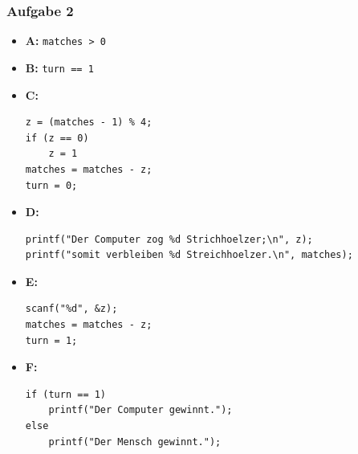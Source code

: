 \documentclass{beamer}
\newcommand*{\ttfamilywithbold}{\fontfamily{lmtt}\selectfont}
\begin{document}
\begin{frame}[fragile] \frametitle{Aufgabe 2}
	\footnotesize
	\begin{itemize}
		\item \textbf{A:} \lstinline|matches > 0|
		\item \textbf{B:} \lstinline|turn == 1|
		\item \textbf{C:} 
		\begin{lstlisting}[basicstyle=\ttfamilywithbold\tiny, numbers=none]
z = (matches - 1) % 4;
if (z == 0)
	z = 1
matches = matches - z;
turn = 0;
		\end{lstlisting}
	\item \textbf{D:} 
	\begin{lstlisting}[basicstyle=\ttfamilywithbold\tiny, numbers=none]
printf("Der Computer zog %d Strichhoelzer;\n", z);
printf("somit verbleiben %d Streichhoelzer.\n", matches);
	\end{lstlisting}
	\item \textbf{E:} 
	\begin{lstlisting}[basicstyle=\ttfamilywithbold\tiny, numbers=none]
scanf("%d", &z);
matches = matches - z;
turn = 1;
	\end{lstlisting}
	\item \textbf{F:}
	\begin{lstlisting}[basicstyle=\ttfamilywithbold\tiny, numbers=none]
if (turn == 1)
	printf("Der Computer gewinnt.");
else
	printf("Der Mensch gewinnt.");
	\end{lstlisting}
	\end{itemize}
\end{frame}
\end{document}
